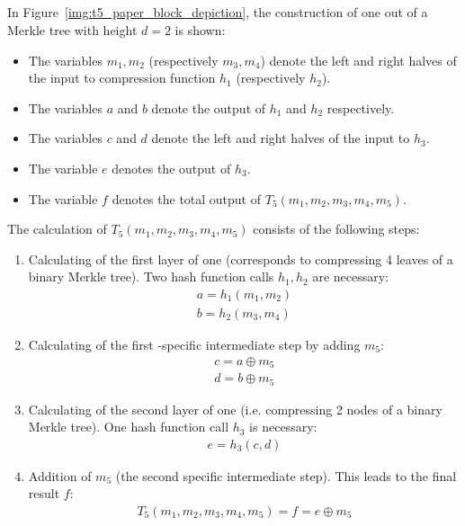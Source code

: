 \subsection{\texorpdfstring{\tfblock}{T5-Block}}
\label{sec:t5_block}
In Figure~\ref{img:t5_paper_block_depiction}, the construction of one \tfblock out of a Merkle tree with height $d=2$ is shown:

\begin{itemize}
\item The variables  $m_1, m_2$ (respectively $m_3, m_4$) denote the left and right halves of the input to compression function $h_1$ (respectively $h_2$).
\item The variables $a$ and $b$ denote the output of $h_1$ and $h_2$ respectively.
\item The variables $c$ and $d$ denote the left and right halves of the input to $h_3$.
\item The variable $e$ denotes the output of $h_3$.
\item The variable $f$ denotes the total output of $T_5(m_1, m_2, m_3, m_4, m_5)$.
\end{itemize}
The calculation of $T_5(m_1, m_2, m_3, m_4, m_5)$ consists of the following steps:
\begin{enumerate}
\item Calculating of the first layer of one \tfblock(corresponds to compressing 4 leaves of a binary Merkle tree). Two hash function calls $h_1, h_2$ are necessary:
\begin{align}
a = h_1(m_1, m_2) \\
b = h_2(m_3, m_4)
\end{align}

\item Calculating of the first \tf-specific intermediate step by adding $m_5$:
\begin{align}
c = a \oplus m_5 \\
d = b \oplus m_5
\end{align}

\item Calculating of the second layer of one \tfblock (i.e. compressing 2 nodes of a binary Merkle tree). One hash function call $h_3$ is necessary:
\begin{align}
e = h_3(c,d)
\end{align}

\item Addition of $m_5$ (the second \tf specific intermediate step). This leads to the final result $f$:
\begin{align}
T_5(m_1, m_2, m_3, m_4, m_5) = f = e \oplus m_5 
\end{align}
\end{enumerate}

